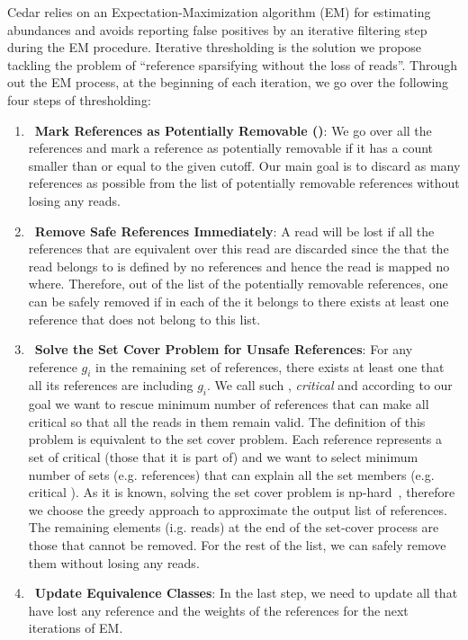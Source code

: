 Cedar relies on an Expectation-Maximization algorithm (EM) for estimating abundances
and avoids reporting false positives by an iterative filtering step during the EM procedure.
Iterative thresholding is the solution we propose tackling the problem of
``reference sparsifying without the loss of reads''.
Through out the EM process, at the beginning of each iteration,
we go over the following four steps of thresholding:
\begin{enumerate}
    \item~\textbf{Mark References as Potentially Removable (\abpt)}:
    We go over all the references and mark a reference as potentially removable
    if it has a count smaller than or equal to the given cutoff.
    Our main goal is to discard as many references as possible
    from the list of potentially removable references without losing any reads.
    \item~\textbf{Remove Safe \abpt References Immediately}:
    A read will be lost if all the references that are equivalent over this read are discarded
    since the \eq that the read belongs to is defined by no references
    and hence the read is mapped no where.
    Therefore, out of the list of the potentially removable references,
    one can be safely removed if in each of the \eqs it belongs to there exists at least one reference
    that does not belong to this list.
    \item~\textbf{Solve the Set Cover Problem for Unsafe \abpt References}:
    For any reference $g_i$ in the remaining set of \abpt references,
    there exists at least one \eq that all its references are \abpt including $g_i$.
    We call such \eqs, \textit{critical \eqs} and according to our goal
    we want to rescue minimum number of \abpt references that can make all critical \eqs
    so that all the reads in them remain valid.
    The definition of this problem is equivalent to the set cover problem.
    Each reference represents a set of critical \eqs (those that it is part of)
    and we want to select minimum number of sets (e.g. references)
    that can explain all the set members (e.g. critical \eqs).
    As it is known, solving the set cover problem is np-hard~\cite{},
    therefore we choose the greedy approach to approximate the output list of references.
    The remaining elements (i.g. reads) at the end of the set-cover process are those that cannot be removed.
    For the rest of the list, we can safely remove them without losing any reads.
    \item~\textbf{Update Equivalence Classes}:
    In the last step, we need to update all \eqs that have lost any reference
    and the weights of the references for the next iterations of EM.
\end{enumerate}

